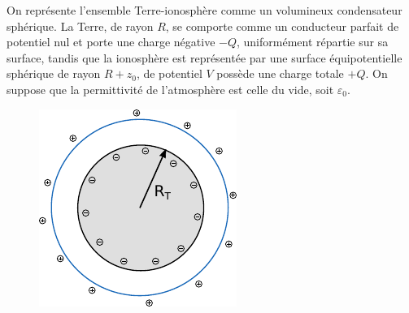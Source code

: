 \documentclass{report}
\begin{document}
On représente l'ensemble Terre-ionosphère comme un volumineux condensateur sphérique. La Terre, de rayon $R$, se comporte comme un conducteur parfait de potentiel nul et porte une charge négative $-Q$, uniformément répartie sur sa surface, tandis que la ionosphère est représentée par une surface équipotentielle sphérique de rayon $R+z_0$, de potentiel $V$ possède une charge totale $+Q$. On suppose que la permittivité de l'atmosphère est celle du vide, soit $\varepsilon_0$. 

\begin{figure}[h!]
\centering
		\includegraphics[scale=1]{em3.pdf}
\end{figure}
\end{document}
